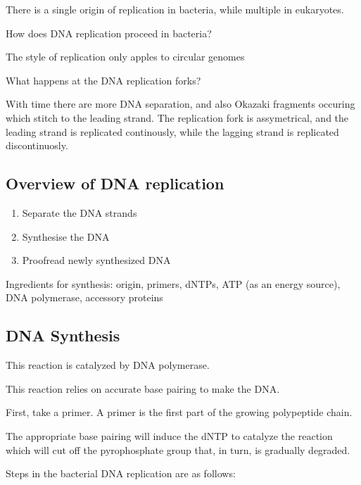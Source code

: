 \documentclass[11pt]{scrartcl}
\begin{document}
There is a single origin of replication in bacteria, while multiple in
eukaryotes.

\begin{ques*}

How does DNA replication proceed in bacteria?

\end{ques*}

The style of replication only apples to circular genomes

\begin{ques*}

  What happens at the DNA replication forks?

\end{ques*}

With time there are more DNA separation, and also Okazaki fragments
occuring which stitch to the leading strand.  The replication fork is
assymetrical, and the leading strand is replicated continously, while
the lagging strand is replicated discontinuosly.

\subsection{Overview of DNA replication}

\begin{enumerate}
\item\label{item:2} Separate the DNA strands
\item Synthesise the DNA
\item Proofread newly synthesized DNA
\end{enumerate}

Ingredients for synthesis: origin, primers, dNTPs, ATP (as an energy
source), DNA polymerase, accessory proteins

\subsection{DNA Synthesis}

This reaction is catalyzed by DNΑ polymerase.

This reaction relies on accurate base pairing to make the DNA.

First, take a primer. A primer is the first part of the growing polypeptide chain.

The appropriate base pairing will induce the dNTP to catalyze the
reaction which will cut off the pyrophosphate group that, in turn, is
gradually degraded.

Steps in the bacterial DNA replication are as follows:
\end{document}
